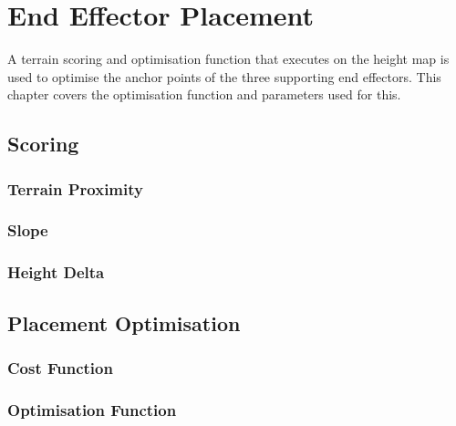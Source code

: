 \chapter{End Effector Placement} \label{chap:effector-placement}
A terrain scoring and optimisation function that executes on the height map is used to optimise the anchor points of the three supporting end effectors.
This chapter covers the optimisation function and parameters used for this.


\section{Scoring}
    \subsection{Terrain Proximity}
    \subsection{Slope}
    \subsection{Height Delta}

\section{Placement Optimisation}
    \subsection{Cost Function}
    \subsection{Optimisation Function}
